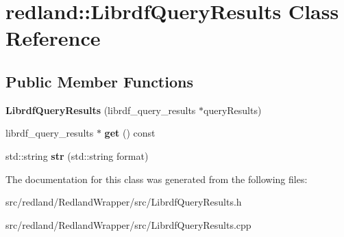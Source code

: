 \hypertarget{classredland_1_1LibrdfQueryResults}{}\section{redland\+:\+:Librdf\+Query\+Results Class Reference}
\label{classredland_1_1LibrdfQueryResults}
\subsection*{Public Member Functions}
\begin{DoxyCompactItemize}
\item 
\mbox{\label{classredland_1_1LibrdfQueryResults_a8c9e17542c836ff3dd09da68bfc334f1}} 
{\bfseries Librdf\+Query\+Results} (librdf\+\_\+query\+\_\+results $\ast$query\+Results)
\item 
\mbox{\label{classredland_1_1LibrdfQueryResults_aa40ed7731b543dfc971b5acbb016cfee}} 
librdf\+\_\+query\+\_\+results $\ast$ {\bfseries get} () const
\item 
\mbox{\label{classredland_1_1LibrdfQueryResults_acb51d92dfce59fdc64bd475326b038bf}} 
std\+::string {\bfseries str} (std\+::string format)
\end{DoxyCompactItemize}


The documentation for this class was generated from the following files\+:\begin{DoxyCompactItemize}
\item 
src/redland/\+Redland\+Wrapper/src/Librdf\+Query\+Results.\+h\item 
src/redland/\+Redland\+Wrapper/src/Librdf\+Query\+Results.\+cpp\end{DoxyCompactItemize}
